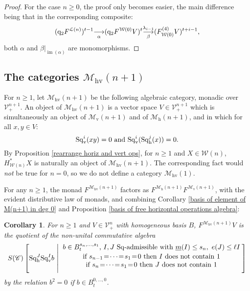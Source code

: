 \documentclass[11pt]{amsart} \renewcommand{\baselinestretch}{1.2}
\theoremstyle{plain}
\newtheorem{cor}[thm]{Corollary}
\numberwithin{equation}{section} %
\theoremstyle{plain}
\newtheorem{cor}[thm]{Corollary}
\numberwithin{equation}{chapter} %
\DeclareMathOperator{\im}{im}
\renewcommand{\to}{\longrightarrow}
\newcommand{\scrC}{\mathscr{C}}
\newcommand{\calV}{\mathcal{V}}
\newcommand{\calw}{\mathcal{W}}
\newcommand{\call}{\mathcal{L}}
\newcommand{\calMv}{\mathcal{M}\dver}
\newcommand{\calMh}{\mathcal{M}\dhor}
\newcommand{\calMhv}{\mathcal{M}_\mathrm{hv}}
\newcommand{\CommOperad}{{\scrC}}
\newcommand{\vect}[2]{\calV^{#1}_{#2}}
\newcommand{\quadgrad}[1]{\mathrm{q}_{#1}}
\newcommand{\mono}{{\to}}
\newcommand{\minDimSq}{\underline{m}}
\newcommand{\excess}{e}
\newcommand{\Sq}{\mathrm{Sq}}
\newcommand{\uver}{^\mathrm{v}}
\newcommand{\dver}{_\mathrm{v}}
\newcommand{\dhor}{_\mathrm{h}}
\newcommand{\Sqh}{\mathrm{Sq}\dhor}
\newcommand{\Sqv}{\mathrm{Sq}\dver}
\newcommand{\deltav}{\delta\uver}
\newcommand{\SubsectionOrSection}[1]{\subsection{#1}}
\begin{document}
\begin{Cohomology Operations for W and U}
\begin{proof}
For the case $n\geq0$, the proof only becomes easier, the main difference being that in the corresponding composite:
\[(\quadgrad{2}F^{\call(n)})^{t-1}\underset{\smash{\alpha}}{{\to}} (\quadgrad{2}F^{\calw(0)}V)^{t}\underset{\smash{\beta}}{\overset{\lambda_{i-1}}{\mono}} (F^{(4)}_{\calw(0)}V)^{t+i-1},\]
both $\alpha$ and $\beta|_{\im(\alpha)}$ are monomorphisms.
\end{proof}

\SubsectionOrSection{The categories $\calMhv(n+1)$}
For $n\geq1$, let $\calMhv(n+1)$ be the following algebraic category, monadic over $\vect{n+1}{+}$. An object of $\calMhv(n+1)$ is a vector space $V\in \vect{n+1}{+}$ which is simultaneously an object of $\calMv(n+1)$ and of $\calMh(n+1)$, and in which for all $x,y\in V$:
\[\Sqv^i(xy)=0\textup{ and }\Sqv^i(\Sqh^j(x))=0.\]
By Proposition \ref{rearrange horiz and vert ops}, for $n\geq1$ and $X\in\calw(n)$, $H^*_{\calw(n)}X$ is naturally an object of $\calMhv(n+1)$. The corresponding fact would \emph{not} be true for $n=0$, so we do not define a category $\calMhv(1)$.

For any $n\geq1$, the monad $F^{\calMhv(n+1)}$ factors as $F^{\calMh(n+1)}F^{\calMv(n+1)}$, with the evident distributive law of monads, and combining Corollary \ref{basis of element of M(n+1) in deg 0} and Proposition \ref{basis of free horizontal operations algebra}:
\begin{cor}
\label{calMhv(n+1) description}
For $n\geq1$ and $V\in\vect{n}{+}$ with homogeneous basis $B$,  $F^{\calMhv(n+1)}V$ is the quotient of the non-unital commutative algebra
%
%
%
\[S(\CommOperad) \left[\Sqh^J\Sq\dver^Ib\ \middle|\ \genfrac{}{}{0pt}{}{{\displaystyle\genfrac{}{}{0pt}{}{b\in B^{s_{n},\ldots,s_1}_t\textup{, $I,J$ $\Sq$-admissible with }\minDimSq(I)\leq s_n,\ \excess(J)\leq \ell I}{\textup{if }s_{n-1}\!=\!\cdots\!=\!s_1\!=\!0\textup{ then $I$ does not contain 1}}}}{
\textup{if }s_{n}\!=\!\cdots\!=\!s_1\!=\!0\textup{ then $J$ does not contain 1}
}
\right]\]
by the relation $b^2=0$ if $b\in B_t^{0,\ldots,0}$.
\end{cor}



\end{Cohomology Operations for W and U}
\end{document}

